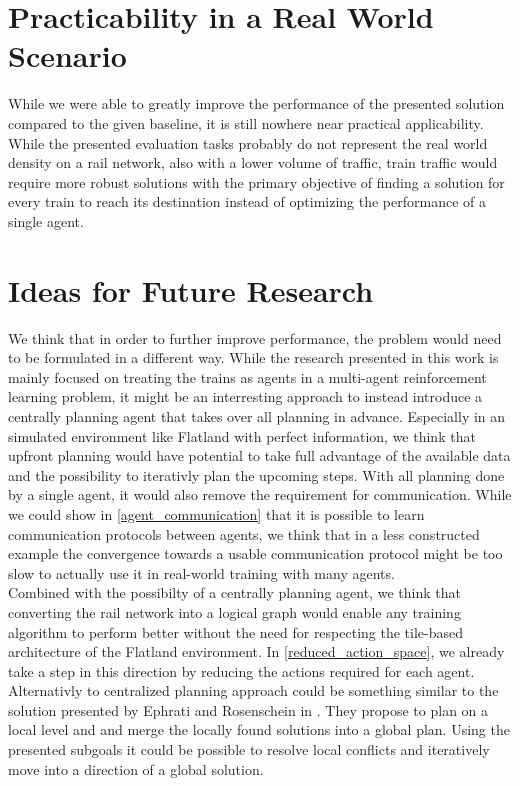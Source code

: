 \section{Practicability in a Real World Scenario}\label{discussion_real_world}
While we were able to greatly improve the performance of the presented solution compared to the given baseline, it is still nowhere near practical applicability. While the presented evaluation tasks probably do not represent the real world density on a rail network, also with a lower volume of traffic, train traffic would require more robust solutions with the primary objective of finding a solution for every train to reach its destination instead of optimizing the performance of a single agent.

\section{Ideas for Future Research}\label{discussion_research}
We think that in order to further improve performance, the problem would need to be formulated in a different way. While the research presented in this work is mainly focused on treating the trains as agents in a multi-agent reinforcement learning problem, it might be an interresting approach to instead introduce a centrally planning agent that takes over all planning in advance. Especially in an simulated environment like Flatland with perfect information, we think that upfront planning would have potential to take full advantage of the available data and the possibility to iterativly plan the upcoming steps. With all planning done by a single agent, it would also remove the requirement for communication. While we could show in \autoref{agent_communication} that it is possible to learn communication protocols between agents, we think that in a less constructed example the convergence towards a usable communication protocol might be too slow to actually use it in real-world training with many agents.\\
Combined with the possibilty of a centrally planning agent, we think that converting the rail network into a logical graph would enable any training algorithm to perform better without the need for respecting the tile-based architecture of the Flatland environment. In \autoref{reduced_action_space}, we already take a step in this direction by reducing the actions required for each agent.\\
Alternativly to centralized planning approach could be something similar to the solution presented by Ephrati and Rosenschein in \cite{Ephrati1993MultiAgentPA}. They propose to plan on a local level and and merge the locally found solutions into a global plan. Using the presented subgoals it could be possible to resolve local conflicts and iteratively move into a direction of a global solution.

